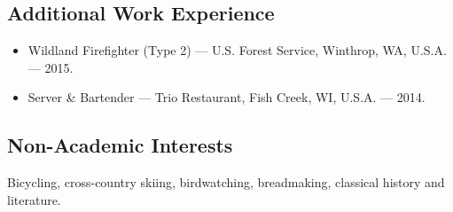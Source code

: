 \subsection*{\textbf{Additional Work Experience}}

\begin{itemize}[label={}]
	\item Wildland Firefighter (Type 2) --- U.S. Forest Service, Winthrop, WA, U.S.A. --- 2015.
	\item Server \& Bartender --- Trio Restaurant, Fish Creek, WI, U.S.A. --- 2014.
\end{itemize}

\subsection*{\textbf{Non-Academic Interests}}
	\hspace{5ex}
 	Bicycling, cross-country skiing, birdwatching, breadmaking, classical history and literature.